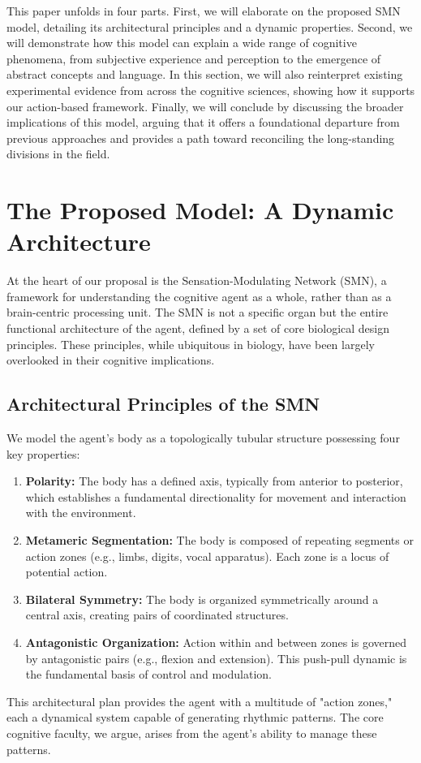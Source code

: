 \documentclass[10pt,letterpaper]{article}
\begin{document}
This paper unfolds in four parts. First, we will elaborate on the proposed SMN model, detailing its architectural principles and a dynamic properties. Second, we will demonstrate how this model can explain a wide range of cognitive phenomena, from subjective experience and perception to the emergence of abstract concepts and language. In this section, we will also reinterpret existing experimental evidence from across the cognitive sciences, showing how it supports our action-based framework. Finally, we will conclude by discussing the broader implications of this model, arguing that it offers a foundational departure from previous approaches and provides a path toward reconciling the long-standing divisions in the field.

\section{The Proposed Model: A Dynamic Architecture}
At the heart of our proposal is the Sensation-Modulating Network (SMN), a framework for understanding the cognitive agent as a whole, rather than as a brain-centric processing unit. The SMN is not a specific organ but the entire functional architecture of the agent, defined by a set of core biological design principles. These principles, while ubiquitous in biology, have been largely overlooked in their cognitive implications.

\subsection*{Architectural Principles of the SMN}
We model the agent's body as a topologically tubular structure possessing four key properties:
\begin{enumerate}
    \item \textbf{Polarity:} The body has a defined axis, typically from anterior to posterior, which establishes a fundamental directionality for movement and interaction with the environment.
    \item \textbf{Metameric Segmentation:} The body is composed of repeating segments or action zones (e.g., limbs, digits, vocal apparatus). Each zone is a locus of potential action.
    \item \textbf{Bilateral Symmetry:} The body is organized symmetrically around a central axis, creating pairs of coordinated structures.
    \item \textbf{Antagonistic Organization:} Action within and between zones is governed by antagonistic pairs (e.g., flexion and extension). This push-pull dynamic is the fundamental basis of control and modulation.
\end{enumerate}
This architectural plan provides the agent with a multitude of "action zones," each a dynamical system capable of generating rhythmic patterns. The core cognitive faculty, we argue, arises from the agent's ability to manage these patterns.
\end{document}
